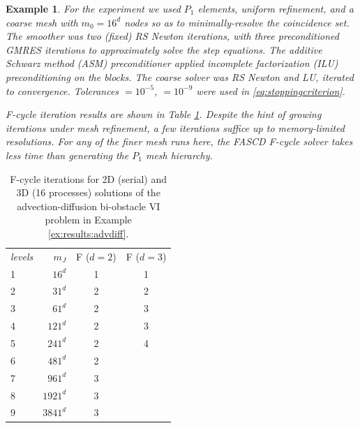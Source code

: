 \documentclass[letterpaper,final,12pt,reqno]{amsart}
\theoremstyle{cstyle}
\theoremstyle{cstyle*}
\theoremstyle{dstyle}
\newtheorem{example}[theorem]{Example}
\numberwithin{equation}{section}
\numberwithin{figure}{section}
\numberwithin{table}{section}
\numberwithin{theorem}{section}
\begin{document}
\begin{example}
For the experiment we used $P_1$ elements, uniform refinement, and a coarse mesh with $m_0=16^d$ nodes so as to minimally-resolve the coincidence set.  The smoother was two (fixed) RS Newton iterations,  with three preconditioned GMRES iterations to approximately solve the step equations.  The additive Schwarz method (ASM) preconditioner applied incomplete factorization (ILU) preconditioning on the blocks.  The coarse solver was RS Newton and LU, iterated to convergence.  Tolerances  $=10^{-5}$,  $=10^{-9}$ were used in \eqref{eq:stoppingcriterion}.

F-cycle iteration results are shown in Table \ref{tab:results:advdiff}.  Despite the hint of growing iterations under mesh refinement, a few iterations suffice up to memory-limited resolutions.  For any of the finer mesh runs here, the FASCD F-cycle solver takes less time than generating the $P_1$ mesh hierarchy.
\end{example}

\begin{table}[ht]
\begin{tabular}{lr@{\hskip 7mm}c@{\hskip 4mm}c}
\emph{levels} & $m_J$ & F ($d=2$) & F ($d=3$) \\ \cmidrule{1-4}
 1 &    $16^d$ & 1 & 1 \\
 2 &    $31^d$ & 2 & 2 \\
 3 &    $61^d$ & 2 & 3 \\
 4 &   $121^d$ & 2 & 3 \\
 5 &   $241^d$ & 2 & 4 \\
 6 &   $481^d$ & 2 \\
 7 &   $961^d$ & 3 \\
 8 &  $1921^d$ & 3 \\
 9 &  $3841^d$ & 3
\end{tabular}
\bigskip
\caption{F-cycle iterations for 2D (serial) and 3D (16 processes) solutions of the advection-diffusion bi-obstacle VI problem in Example \ref{ex:results:advdiff}.}
\label{tab:results:advdiff}
\end{table}
\end{document}
